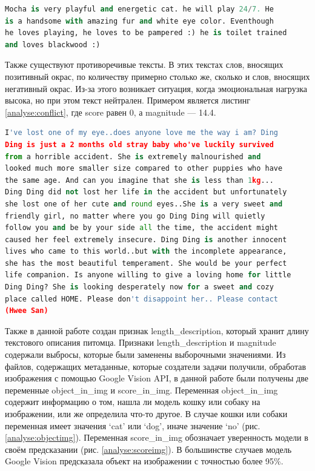 \documentclass[14pt]{mmcs_article}
\begin{document}
\begin{lstlisting}[language=Python, caption={Пример позитивно окрашенного текста}, label=analyse:pos]
Mocha is very playful and energetic cat. he will play 24/7. He 
is a handsome with amazing fur and white eye color. Eventhough 
he loves playing, he loves to be pampered :) he is toilet trained 
and loves blackwood :)
\end{lstlisting}

Также существуют противоречивые тексты. В этих текстах слов, вносящих позитивный окрас, по количеству примерно столько же, сколько и слов, вносящих негативный окрас. Из-за этого возникает ситуация, когда эмоциональная нагрузка высока, но при этом текст нейтрален. Примером является листинг \ref{analyse:conflict}, где score равен 0, а magnitude — 14.4.

\begin{lstlisting}[language=Python, caption={Пример противоречивого текста}, label=analyse:conflict]
I've lost one of my eye..does anyone love me the way i am? Ding 
Ding is just a 2 months old stray baby who've luckily survived 
from a horrible accident. She is extremely malnourished and 
looked much more smaller size compared to other puppies who have 
the same age. And can you imagine that she is less than 1kg... 
Ding Ding did not lost her life in the accident but unfortunately 
she lost one of her cute and round eyes..She is a very sweet and 
friendly girl, no matter where you go Ding Ding will quietly 
follow you and be by your side all the time, the accident might 
caused her feel extremely insecure. Ding Ding is another innocent 
lives who came to this world..but with the incomplete appearance, 
she has the most beautiful temperament. She would be your perfect 
life companion. Is anyone willing to give a loving home for little 
Ding Ding? She is looking desperately now for a sweet and cozy 
place called HOME. Please don't disappoint her.. Please contact 
(Hwee San)
\end{lstlisting}

Также в данной работе создан признак length\_description, который хранит длину текстового описания питомца. Признаки length\_description и magnitude содержали выбросы, которые были заменены выборочными значениями.
Из файлов, содержащих метаданные, которые создатели задачи получили, обработав изображения с помощью Google Vision API, в данной работе были получены две переменные object\_in\_img и score\_in\_img. Переменная object\_in\_img содержит информацию о том, нашла ли модель кошку или собаку на изображении, или же определила что-то другое. В случае кошки или собаки переменная имеет значения `cat' или `dog', иначе значение `no' (рис. \ref{analyse:objectimg}). Переменная score\_in\_img обозначает уверенность модели в своём предсказании (рис. \ref{analyse:scoreimg}). В большинстве случаев модель Google Vision предсказала объект на изображении с точностью более 95\%.
\end{document}
